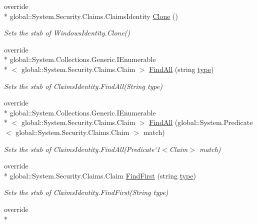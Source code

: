 \begin{DoxyCompactItemize}
override \\*
global\-::\-System.\-Security.\-Claims.\-Claims\-Identity \hyperlink{class_system_1_1_security_1_1_principal_1_1_fakes_1_1_stub_windows_identity_ac96cc565db4b323c3f360ff905d4348f}{Clone} ()
\begin{DoxyCompactList}\small\item\em Sets the stub of Windows\-Identity.\-Clone()\end{DoxyCompactList}\item 
override \\*
global\-::\-System.\-Collections.\-Generic.\-I\-Enumerable\\*
$<$ global\-::\-System.\-Security.\-Claims.\-Claim $>$ \hyperlink{class_system_1_1_security_1_1_principal_1_1_fakes_1_1_stub_windows_identity_a33f9815324a28f9d204405440e92edb6}{Find\-All} (string \hyperlink{jquery-1_810_82-vsdoc_8js_a3940565e83a9bfd10d95ffd27536da91}{type})
\begin{DoxyCompactList}\small\item\em Sets the stub of Claims\-Identity.\-Find\-All(\-String type)\end{DoxyCompactList}\item 
override \\*
global\-::\-System.\-Collections.\-Generic.\-I\-Enumerable\\*
$<$ global\-::\-System.\-Security.\-Claims.\-Claim $>$ \hyperlink{class_system_1_1_security_1_1_principal_1_1_fakes_1_1_stub_windows_identity_a4108aec6e7f7c00d58c3ba5a98a05b13}{Find\-All} (global\-::\-System.\-Predicate$<$ global\-::\-System.\-Security.\-Claims.\-Claim $>$ match)
\begin{DoxyCompactList}\small\item\em Sets the stub of Claims\-Identity.\-Find\-All(Predicate`1$<$Claim$>$ match)\end{DoxyCompactList}\item 
override \\*
global\-::\-System.\-Security.\-Claims.\-Claim \hyperlink{class_system_1_1_security_1_1_principal_1_1_fakes_1_1_stub_windows_identity_a779446f260ee7b63dd858620b5aab606}{Find\-First} (string \hyperlink{jquery-1_810_82-vsdoc_8js_a3940565e83a9bfd10d95ffd27536da91}{type})
\begin{DoxyCompactList}\small\item\em Sets the stub of Claims\-Identity.\-Find\-First(\-String type)\end{DoxyCompactList}\item 
override \\*

\end{DoxyCompactItemize}

